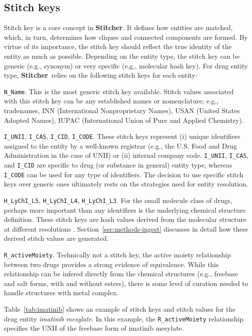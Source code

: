 \documentclass{bioinfo}
\newcommand\st{\textbf{Stitcher}}
\begin{document}
\subsection{Stitch keys}\label{sec:stitch-keys}
Stitch key is a core concept in \st. It defines how entities are
matched, which, in turn, determines how cliques and connected
components are formed. By virtue of its importance, the stitch key
should reflect the true identity of the entity as much as possible.
Depending on the entity type, the stitch key can be generic (e.g.,
synonym) or very specific (e.g., molecular hash key). For drug entity
type, \st\ relies on the following stitch keys for each entity: 
\begin{unlist}
\item{\texttt{N\_Name}.} This is the most generic stitch key
available. Stitch values associated with this stitch key can be any
established names or nomenclature; e.g., tradenames, INN
(International Nonproprietary Names), USAN (United States Adopted
Names), IUPAC (International Union of Pure and Applied Chemistry). 
\item{\texttt{I\_UNII}, \texttt{I\_CAS}, \texttt{I\_CID}, \texttt{I\_CODE}.}
These stitch keys represent (i) unique identifiers assigned to the entity by
a well-known registrar (e.g., the U.S. Food and Drug Administration in
the case of UNII) or (ii) internal company code. \texttt{I\_UNII},
\texttt{I\_CAS}, and \texttt{I\_CID} are specific to drug (or
substance in general) entity type, whereas \texttt{I\_CODE} can be
used for any type of identifiers. The decision to use specific stitch
keys over generic ones ultimately rests on the strategies used for
entity resolution.
\item{\texttt{H\_LyChI\_L5}, \texttt{H\_LyChI\_L4}, \texttt{H\_LyChI\_L3}.}
For the small molecule class of drugs, perhaps more important than any
identifiers is the underlying chemical structure definition. These
stitch keys are hash values derived from the molecular structure at
different resolutions \citep{lychi}. Section~\ref{sec:methods-ingest}
discusses in detail how these derived stitch values are generated. 
\item{\texttt{R\_activeMoiety}.} Technically not a stitch key, the
active moiety relationship between two drugs provides a strong
evidence of equivalence. While this relationship can be infered
directly from the chemical structures (e.g., freebase and salt forms,
with and without esters), there is some level of curation needed to
handle structures with metal complex. 
\end{unlist}
Table~\ref{tab:imatinib} shows an example of stitch keys and stitch values for
the drug entity \emph{imatinib mesylate}. In this example,
the \texttt{R\_activeMoiety} relationship specifies the UNII of the
freebase form of imatinib mesylate. 
\end{document}
